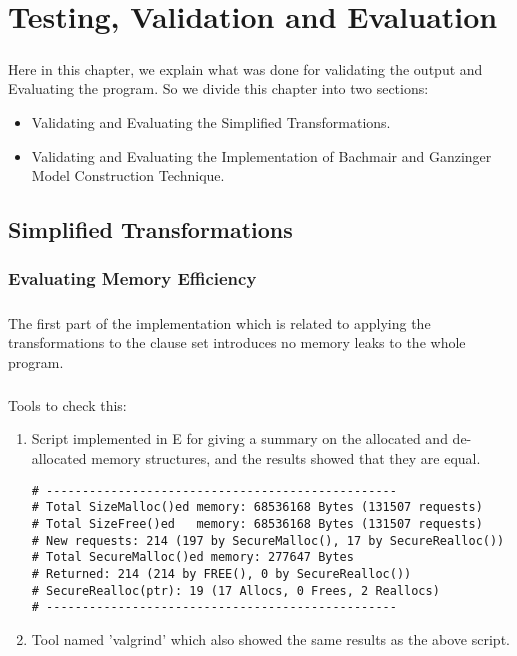 \chapter{Testing, Validation and Evaluation}\label{chap:test_and_val}
\paragraph{}
Here in this chapter, we explain what was done for validating the output and Evaluating the program. So we divide this chapter into two sections:
\begin{itemize}
	\item Validating and Evaluating the Simplified Transformations.
	\item Validating and Evaluating the Implementation of Bachmair and Ganzinger Model Construction Technique.
\end{itemize} 

\section{Simplified Transformations}

\subsection{Evaluating Memory Efficiency}\label{sub:val_tran_mem}
\paragraph{}
The first part of the implementation which is related to applying the transformations to the clause set introduces no memory leaks to the whole program.


\paragraph{}
Tools to check this:
\begin{enumerate}
	\item Script implemented in E for giving a summary on the allocated and de-allocated memory structures, and the results showed that they are equal.
		\begin{lstlisting}
# -------------------------------------------------
# Total SizeMalloc()ed memory: 68536168 Bytes (131507 requests)
# Total SizeFree()ed   memory: 68536168 Bytes (131507 requests)
# New requests: 214 (197 by SecureMalloc(), 17 by SecureRealloc())
# Total SecureMalloc()ed memory: 277647 Bytes
# Returned: 214 (214 by FREE(), 0 by SecureRealloc())
# SecureRealloc(ptr): 19 (17 Allocs, 0 Frees, 2 Reallocs)
# -------------------------------------------------
		\end{lstlisting}
	\item Tool named 'valgrind' which also showed the same results as the above script.
\end{enumerate}


